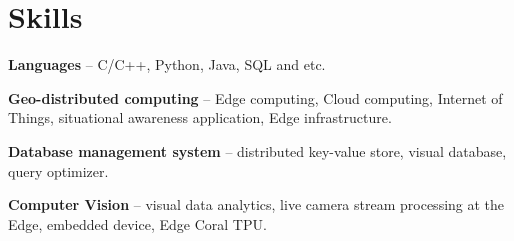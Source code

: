 
\section{Skills}
\begin{small}
	\parbox[t][][t]{\linewidth}{
		\textbf{Languages} -- C/C++, Python, Java, SQL and etc.
		\smallbreak
	}
	\parbox[t][][t]{\linewidth}{
		\textbf{Geo-distributed computing} -- Edge computing, Cloud computing, Internet of Things, situational awareness application, Edge infrastructure.
		\smallbreak
	}
  \parbox[t][][t]{\linewidth}{
		\textbf{Database management system} -- distributed key-value store, visual database, query optimizer.
    \smallbreak
	}
  \parbox[t][][t]{\linewidth}{
		\textbf{Computer Vision} -- visual data analytics, live camera stream processing at the Edge, embedded device, Edge Coral TPU.
    \smallbreak
	}
	\smallskip
\end{small}
